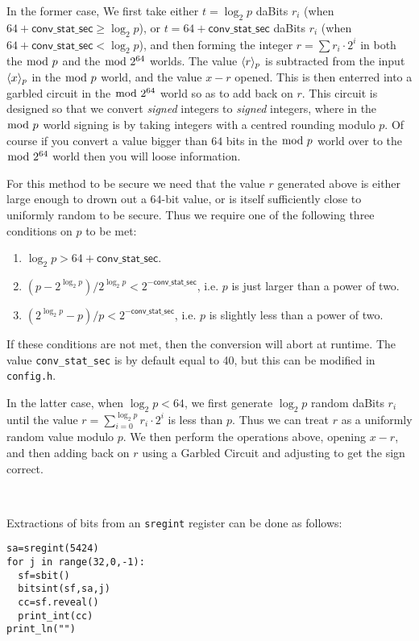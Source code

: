 In the former case, We first take either $t=\log_2 p$ daBits $r_i$ 
(when $64+\mathsf{conv\_stat\_sec} \ge \log_2 p$),
or $t=64+\mathsf{conv\_stat\_sec}$ daBits $r_i$ 
(when $64+\mathsf{conv\_stat\_sec}<\log_2 p$),
and then forming the integer $r = \sum r_i \cdot 2^i$
in both the $\bmod \; p$ and the $\bmod \; 2^{64}$ worlds. 
The value $\langle r \rangle_p$ is subtracted from the input $\langle x \rangle_p$ in 
the $\bmod \; p$ world, and the value $x-r$ opened. 
This is then enterred into a garbled circuit in the $\bmod \; 2^{64}$ world so as to add back on $r$. 
This circuit is designed so that we convert {\it signed}  integers to {\it signed}
integers, where in the $\bmod \; p$ world signing is by taking integers with a centred 
rounding modulo $p$.
Of course if you convert a value bigger than $64$ bits in the $\bmod \; p$ world over to the $\bmod \; 2^{64}$
world then you will loose information.

For this method to be secure we need that the value $r$ generated above is 
either large enough to drown out a $64$-bit value, or is itself sufficiently close 
to uniformly random to be secure.
Thus we require one of the following three conditions on $p$ to be met:
\begin{enumerate}
\item $\log_2 p > 64+ \mathsf{conv\_stat\_sec}$.
\item $(p - 2^{\log_2 p}) / 2^{\log_2 p} < 2^{-\mathsf{conv\_stat\_sec}}$, i.e. $p$ is just larger than a power of two.
\item $(2^{\log_2 p}-p) / p < 2^{-\mathsf{conv\_stat\_sec}}$, i.e. $p$ is slightly less than a power of two.
\end{enumerate}
If these conditions are not met, then the conversion will abort at runtime.
The value \verb|conv_stat_sec| is by default equal to 40, but this can be modified in
\verb|config.h|.

In the latter case, when $\log_2 p < 64$, we first generate $\log_2 p$ random daBits
$r_i$ until the value $r = \sum_{i=0}^{\log_2 p} r_i \cdot 2^i$ is less than $p$.
Thus we can treat $r$ as a uniformly random value modulo $p$.
We then perform the operations above, opening $x-r$, and then adding back on $r$
using a Garbled Circuit and adjusting to get the sign correct.

~

\noindent
Extractions of bits from an \verb|sregint| register can be done as follows:
\begin{lstlisting}
sa=sregint(5424)
for j in range(32,0,-1):
  sf=sbit()
  bitsint(sf,sa,j)
  cc=sf.reveal()
  print_int(cc)
print_ln("")
\end{lstlisting}

